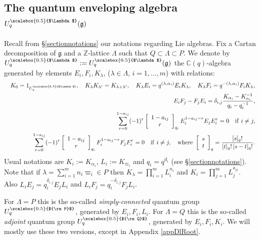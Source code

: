 \documentclass[11pt]{amsart}
\newcommand{\Q}{{\scalebox{0.5}{${\rm Q}$}}}
\newcommand{\Pup}{{\scalebox{0.5}{${\rm P}$}}}
\newcommand{\Lam}{{\scalebox{0.5}{$\Lambda$}}}
\begin{document}
\subsection{The quantum enveloping algebra \texorpdfstring{$U_q^\Lam(\mathfrak {g})$}{ }}\label{sec:Uq} Recall from \S\ref{sectionnotations} our notations regarding Lie algebras. Fix a Cartan decomposition of $\mathfrak {g}$ and a $\mathbb{Z}$-lattice $\Lambda$ such that $Q \subset \Lambda \subset P$. We denote by $U_q^\Lam := U_q^\Lam(\mathfrak{g})$ the ${\mathbb C}(q)$-algebra generated by elements $E_i, F_i, K_{\lambda}$, ($\lambda \in \Lambda$, $i=1,\ldots,m$) with relations:
\begin{eqnarray}
&&K_0 = 1_{U_q^\Lam}, \quad K_{\lambda}K_{\lambda'} = K_{\lambda + \lambda'}, \quad K_{\lambda}E_i = q^{(\lambda,\alpha_i)}E_iK_{\lambda}, \quad K_{\lambda}F_i = q^{-(\lambda,\alpha_i)}F_iK_{\lambda}, \notag \\
&&E_iF_j-F_jE_i=\delta_{i,j}\frac{K_{\alpha_i}-K_{\alpha_i}^{-1}}{q_i-q_i^{-1}},\label{EFK}\notag\\
&&\sum_{r=0}^{1-a_{ij}} (-1)^r \left[\begin{array}{c} 1-a_{ij} \\ r \end{array}\right]_{q_i} E_i^{1-a_{ij}-r}E_jE_i^{r} = 0 \quad {\rm if}\ i\ne j,\label{Serre1}\notag\\
&&\sum_{r=0}^{1-a_{ij}} (-1)^r  \left[\begin{array}{c} 1-a_{ij} \\ r \end{array}\right]_{q_i}  F_i^{1-a_{ij}-r}F_jF_i^{r} = 0 \quad {\rm if}\ i\ne j, \quad \text{where } \left[\begin{array}{c} s \\ t \end{array}\right]_q = \frac{[s]_q!}{[t]_q!\,[s-t]_q!}.\label{Serre2}\notag
\end{eqnarray}
Usual notations are $K_i := K_{\alpha_i}$, $L_i := K_{\varpi_i}$ and $q_i = q^{d_i}$ (see \S\ref{sectionnotations}). Note that if $\textstyle \lambda=\sum_{i=1}^m n_i \varpi_i \in P$ then $\textstyle K_\lambda=\prod_{i=1}^m L_i^{n_i}$ and $\textstyle K_i =\prod_{j=1}^m L_j^{a_{ji}}$. Also $L_iE_j = q_i^{\delta_{i,j}}E_jL_i$ and $L_iF_j=q_i^{-\delta_{i,j}}F_jL_i$.

\indent For $\Lambda = P$ this is the so-called {\em simply-connected} quantum group $U_q^\Pup$, generated by $E_i,F_i,L_i$. For $\Lambda = Q$ this is the so-called {\em adjoint} quantum group $U_q^\Q$, generated by $E_i,F_i,K_i$. We will mostly use these two versions, except in  Appendix \ref{appDlRoot}.
\end{document}
